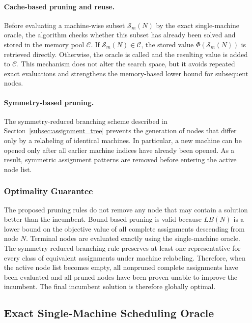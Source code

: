 \documentclass[review,3p,times,authoryear]{elsarticle}
\begin{document}
\paragraph*{Cache-based pruning and reuse.}
Before evaluating a machine-wise subset $\mathcal{S}_m(N)$ by the exact
single-machine oracle, the algorithm checks whether this subset has already
been solved and stored in the memory pool $\mathcal{C}$. If
$\mathcal{S}_m(N)\in\mathcal{C}$, the stored value
$\Phi(\mathcal{S}_m(N))$ is retrieved directly. Otherwise, the oracle is
called and the resulting value is added to $\mathcal{C}$. This mechanism
does not alter the search space, but it avoids repeated exact evaluations
and strengthens the memory-based lower bound for subsequent nodes.

\paragraph*{Symmetry-based pruning.}
The symmetry-reduced branching scheme described in
Section~\ref{subsec:assignment_tree} prevents the generation of nodes that
differ only by a relabeling of identical machines. In particular, a new
machine can be opened only after all earlier machine indices have already
been opened. As a result, symmetric assignment patterns are removed before
entering the active node list.

\subsubsection{Optimality Guarantee}

The proposed pruning rules do not remove any node that may contain a
solution better than the incumbent. Bound-based pruning is valid because
$LB(N)$ is a lower bound on the objective value of all complete assignments
descending from node $N$. Terminal nodes are evaluated exactly using the
single-machine oracle. The symmetry-reduced branching rule preserves at
least one representative for every class of equivalent assignments under
machine relabeling. Therefore, when the active node list becomes empty, all
nonpruned complete assignments have been evaluated and all pruned nodes have
been proven unable to improve the incumbent. The final incumbent solution is
therefore globally optimal.


\subsection{Exact Single-Machine Scheduling Oracle}
\label{subsec:single_machine_oracle}
\end{document}
